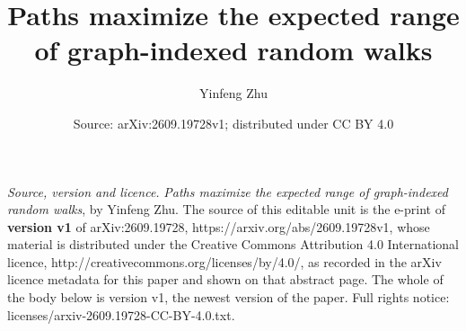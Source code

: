 \documentclass[10pt,a4paper]{amsart}
\theoremstyle{remark}
\numberwithin{equation}{section}
\begin{document}
\title{Paths maximize the expected range of graph-indexed random walks}
\author{Yinfeng Zhu}
\date{Source: arXiv:2609.19728v1; distributed under CC BY 4.0}
\maketitle
\noindent\emph{Source, version and licence.} \emph{Paths maximize the expected range of graph-indexed random walks}, by Yinfeng Zhu. The source of this editable unit is the e-print of \textbf{version v1} of arXiv:2609.19728, https://arxiv.org/abs/2609.19728v1, whose material is distributed under the Creative Commons Attribution 4.0 International licence, http://creativecommons.org/licenses/by/4.0/, as recorded in the arXiv licence metadata for this paper and shown on that abstract page. The whole of the body below is version v1, the newest version of the paper. Full rights notice: licenses/arxiv-2609.19728-CC-BY-4.0.txt.\par\smallskip
\end{document}
